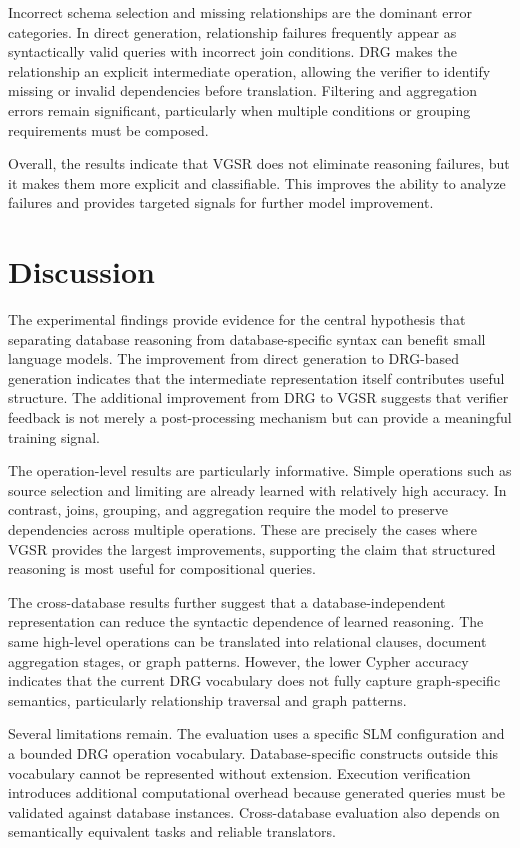 \documentclass[conference]{IEEEtran}
\begin{document}
Incorrect schema selection and missing relationships are the dominant error categories. In direct generation, relationship failures frequently appear as syntactically valid queries with incorrect join conditions. DRG makes the relationship an explicit intermediate operation, allowing the verifier to identify missing or invalid dependencies before translation. Filtering and aggregation errors remain significant, particularly when multiple conditions or grouping requirements must be composed.

Overall, the results indicate that VGSR does not eliminate reasoning failures, but it makes them more explicit and classifiable. This improves the ability to analyze failures and provides targeted signals for further model improvement.

\section{Discussion}
\label{sec:discussion}
The experimental findings provide evidence for the central hypothesis that separating database reasoning from database-specific syntax can benefit small language models. The improvement from direct generation to DRG-based generation indicates that the intermediate representation itself contributes useful structure. The additional improvement from DRG to VGSR suggests that verifier feedback is not merely a post-processing mechanism but can provide a meaningful training signal.

The operation-level results are particularly informative. Simple operations such as source selection and limiting are already learned with relatively high accuracy. In contrast, joins, grouping, and aggregation require the model to preserve dependencies across multiple operations. These are precisely the cases where VGSR provides the largest improvements, supporting the claim that structured reasoning is most useful for compositional queries.

The cross-database results further suggest that a database-independent representation can reduce the syntactic dependence of learned reasoning. The same high-level operations can be translated into relational clauses, document aggregation stages, or graph patterns. However, the lower Cypher accuracy indicates that the current DRG vocabulary does not fully capture graph-specific semantics, particularly relationship traversal and graph patterns.

Several limitations remain. The evaluation uses a specific SLM configuration and a bounded DRG operation vocabulary. Database-specific constructs outside this vocabulary cannot be represented without extension. Execution verification introduces additional computational overhead because generated queries must be validated against database instances. Cross-database evaluation also depends on semantically equivalent tasks and reliable translators.
\end{document}
